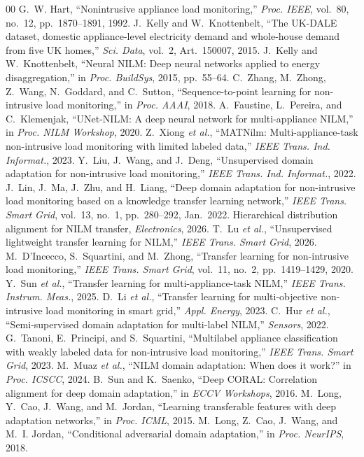 \documentclass[journal]{IEEEtran}
\begin{document}
\begin{thebibliography}{00}
 G.~W. Hart, ``Nonintrusive appliance load monitoring,'' \emph{Proc. IEEE}, vol.~80, no.~12, pp.~1870--1891, 1992.
 J.~Kelly and W.~Knottenbelt, ``The UK-DALE dataset, domestic appliance-level electricity demand and whole-house demand from five UK homes,'' \emph{Sci. Data}, vol.~2, Art.~150007, 2015.
 J.~Kelly and W.~Knottenbelt, ``Neural NILM: Deep neural networks applied to energy disaggregation,'' in \emph{Proc. BuildSys}, 2015, pp.~55--64.
 C.~Zhang, M.~Zhong, Z.~Wang, N.~Goddard, and C.~Sutton, ``Sequence-to-point learning for non-intrusive load monitoring,'' in \emph{Proc. AAAI}, 2018.
 A.~Faustine, L.~Pereira, and C.~Klemenjak, ``UNet-NILM: A deep neural network for multi-appliance NILM,'' in \emph{Proc. NILM Workshop}, 2020.
 Z.~Xiong \emph{et al.}, ``MATNilm: Multi-appliance-task non-intrusive load monitoring with limited labeled data,'' \emph{IEEE Trans. Ind. Informat.}, 2023.
 Y.~Liu, J.~Wang, and J.~Deng, ``Unsupervised domain adaptation for non-intrusive load monitoring,'' \emph{IEEE Trans. Ind. Informat.}, 2022.
 J.~Lin, J.~Ma, J.~Zhu, and H.~Liang, ``Deep domain adaptation for non-intrusive load monitoring based on a knowledge transfer learning network,'' \emph{IEEE Trans. Smart Grid}, vol.~13, no.~1, pp.~280--292, Jan.~2022.
 Hierarchical distribution alignment for NILM transfer, \emph{Electronics}, 2026.
 T.~Lu \emph{et al.}, ``Unsupervised lightweight transfer learning for NILM,'' \emph{IEEE Trans. Smart Grid}, 2026.
 M.~D'Incecco, S.~Squartini, and M.~Zhong, ``Transfer learning for non-intrusive load monitoring,'' \emph{IEEE Trans. Smart Grid}, vol.~11, no.~2, pp.~1419--1429, 2020.
 Y.~Sun \emph{et al.}, ``Transfer learning for multi-appliance-task NILM,'' \emph{IEEE Trans. Instrum. Meas.}, 2025.
 D.~Li \emph{et al.}, ``Transfer learning for multi-objective non-intrusive load monitoring in smart grid,'' \emph{Appl. Energy}, 2023.
 C.~Hur \emph{et al.}, ``Semi-supervised domain adaptation for multi-label NILM,'' \emph{Sensors}, 2022.
 G.~Tanoni, E.~Principi, and S.~Squartini, ``Multilabel appliance classification with weakly labeled data for non-intrusive load monitoring,'' \emph{IEEE Trans. Smart Grid}, 2023.
 M.~Muaz \emph{et al.}, ``NILM domain adaptation: When does it work?'' in \emph{Proc. ICSCC}, 2024.
 B.~Sun and K.~Saenko, ``Deep CORAL: Correlation alignment for deep domain adaptation,'' in \emph{ECCV Workshops}, 2016.
 M.~Long, Y.~Cao, J.~Wang, and M.~Jordan, ``Learning transferable features with deep adaptation networks,'' in \emph{Proc. ICML}, 2015.
 M.~Long, Z.~Cao, J.~Wang, and M.~I. Jordan, ``Conditional adversarial domain adaptation,'' in \emph{Proc. NeurIPS}, 2018.
\end{thebibliography}
\end{document}
